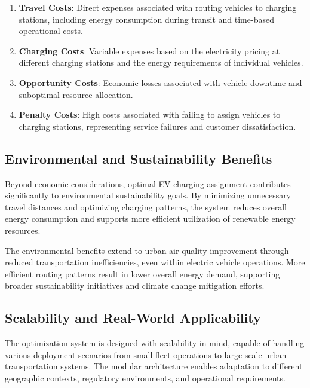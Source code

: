 \documentclass[12pt,a4paper]{article}
\begin{document}
\begin{enumerate}
\item \textbf{Travel Costs}: Direct expenses associated with routing vehicles to charging stations, including energy consumption during transit and time-based operational costs.

\item \textbf{Charging Costs}: Variable expenses based on the electricity pricing at different charging stations and the energy requirements of individual vehicles.

\item \textbf{Opportunity Costs}: Economic losses associated with vehicle downtime and suboptimal resource allocation.

\item \textbf{Penalty Costs}: High costs associated with failing to assign vehicles to charging stations, representing service failures and customer dissatisfaction.
\end{enumerate}

\subsection{Environmental and Sustainability Benefits}

Beyond economic considerations, optimal EV charging assignment contributes significantly to environmental sustainability goals. By minimizing unnecessary travel distances and optimizing charging patterns, the system reduces overall energy consumption and supports more efficient utilization of renewable energy resources.

The environmental benefits extend to urban air quality improvement through reduced transportation inefficiencies, even within electric vehicle operations. More efficient routing patterns result in lower overall energy demand, supporting broader sustainability initiatives and climate change mitigation efforts.

\subsection{Scalability and Real-World Applicability}

The optimization system is designed with scalability in mind, capable of handling various deployment scenarios from small fleet operations to large-scale urban transportation systems. The modular architecture enables adaptation to different geographic contexts, regulatory environments, and operational requirements.
\end{document}
